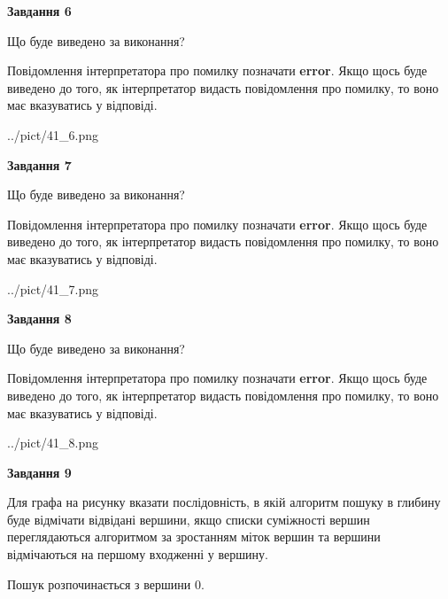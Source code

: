 \documentclass[12pt, ukrainian]{article}
\begin{document}
{\begin {large}
{\begin {center}\textbf{Завдання 6}\end {center}}\par
Що буде виведено за виконання?

Повідомлення інтерпретатора про помилку позначати \textbf{error}.
Якщо щось буде виведено до того, як інтерпретатор видасть повідомлення про помилку, 
то воно має вказуватись у відповіді. \par


\begin{center}
	{../pict/41_6.png}
\end{center}
\newpage

{\begin {center}\textbf{Завдання 7}\end {center}}\par
Що буде виведено за виконання?

Повідомлення інтерпретатора про помилку позначати \textbf{error}.
Якщо щось буде виведено до того, як інтерпретатор видасть повідомлення про помилку, 
то воно має вказуватись у відповіді. \par


\begin{center}
	{../pict/41_7.png}
\end{center}
\newpage

{\begin {center}\textbf{Завдання 8}\end {center}}\par
Що буде виведено за виконання?

Повідомлення інтерпретатора про помилку позначати \textbf{error}.
Якщо щось буде виведено до того, як інтерпретатор видасть повідомлення про помилку, 
то воно має вказуватись у відповіді. \par


\begin{center}
	{../pict/41_8.png}
\end{center}
\newpage

{\begin {center}\textbf{Завдання 9}\end {center}}\par
Для графа на рисунку вказати послідовність, в якій алгоритм пошуку в глибину буде відмічати відвідані вершини, якщо списки суміжності вершин переглядаються алгоритмом за зростанням міток вершин та вершини відмічаються на першому вход\-женні у вершину.\par
Пошук розпочинається з вершини 0.\par


\end{large}}
\end{document}
